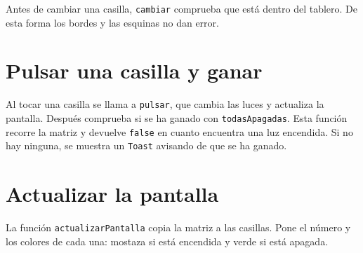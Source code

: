 Antes de cambiar una casilla, \texttt{cambiar} comprueba que está dentro del tablero.
De esta forma los bordes y las esquinas no dan error.

\section{Pulsar una casilla y ganar}
Al tocar una casilla se llama a \texttt{pulsar}, que cambia las luces y actualiza la pantalla.
Después comprueba si se ha ganado con \texttt{todasApagadas}.
Esta función recorre la matriz y devuelve \texttt{false} en cuanto encuentra una luz encendida.
Si no hay ninguna, se muestra un \texttt{Toast} avisando de que se ha ganado.

\section{Actualizar la pantalla}
La función \texttt{actualizarPantalla} copia la matriz a las casillas.
Pone el número y los colores de cada una: mostaza si está encendida y verde si está apagada.